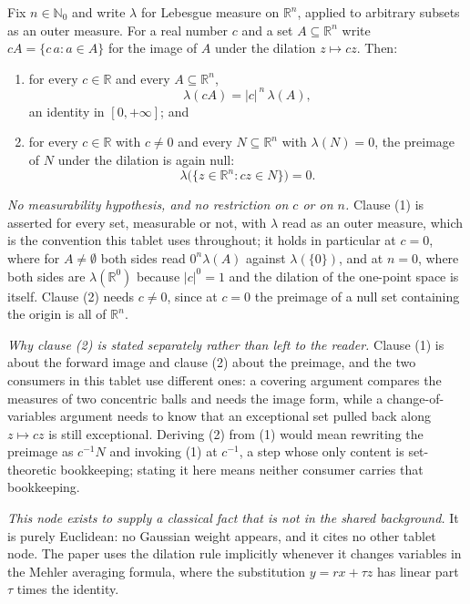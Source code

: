\begin{lemma}
Fix $n \in \mathbb{N}_0$ and write $\lambda$ for Lebesgue measure on
$\mathbb{R}^n$, applied to arbitrary subsets as an outer measure.  For a real
number $c$ and a set $A \subseteq \mathbb{R}^n$ write
$cA = \{c\,a : a \in A\}$ for the image of $A$ under the dilation
$z \mapsto cz$.  Then:
\begin{enumerate}
\item for every $c \in \mathbb{R}$ and every $A \subseteq \mathbb{R}^n$,
\[
  \lambda(cA) = |c|^{\,n}\,\lambda(A) ,
\]
an identity in $[0,+\infty]$; and
\item for every $c \in \mathbb{R}$ with $c \neq 0$ and every
$N \subseteq \mathbb{R}^n$ with $\lambda(N) = 0$, the preimage of $N$ under the
dilation is again null:
\[
  \lambda\bigl(\{z \in \mathbb{R}^n : cz \in N\}\bigr) = 0 .
\]
\end{enumerate}

\emph{No measurability hypothesis, and no restriction on $c$ or on $n$.}
Clause (1) is asserted for every set, measurable or not, with $\lambda$ read as
an outer measure, which is the convention this tablet uses throughout; it holds
in particular at $c = 0$, where for $A \neq \emptyset$ both sides read
$0^n\lambda(A)$ against $\lambda(\{0\})$, and at $n = 0$, where both sides are
$\lambda(\mathbb{R}^0)$ because $|c|^0 = 1$ and the dilation of the
one-point space is itself.  Clause (2) needs $c \neq 0$, since at $c = 0$ the
preimage of a null set containing the origin is all of $\mathbb{R}^n$.

\emph{Why clause (2) is stated separately rather than left to the reader.}
Clause (1) is about the forward image and clause (2) about the preimage, and the
two consumers in this tablet use different ones: a covering argument compares
the measures of two concentric balls and needs the image form, while a
change-of-variables argument needs to know that an exceptional set pulled back
along $z \mapsto cz$ is still exceptional.  Deriving (2) from (1) would mean
rewriting the preimage as $c^{-1}N$ and invoking (1) at $c^{-1}$, a step whose
only content is set-theoretic bookkeeping; stating it here means neither
consumer carries that bookkeeping.

\emph{This node exists to supply a classical fact that is not in the shared
background.}  It is purely Euclidean: no Gaussian weight appears, and it cites
no other tablet node.  The paper uses the dilation rule implicitly whenever it
changes variables in the Mehler averaging formula, where the substitution
$y = r x + \tau z$ has linear part $\tau$ times the identity.
\end{lemma}
